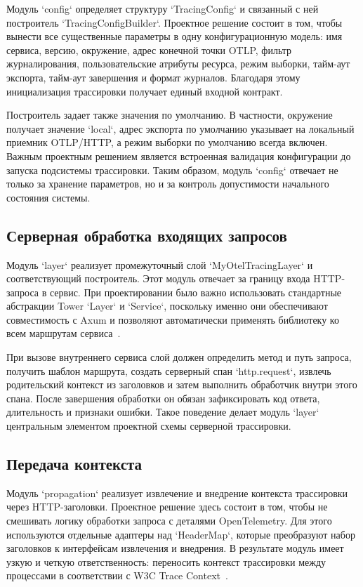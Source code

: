 Модуль `config` определяет структуру `TracingConfig` и связанный с ней построитель
`TracingConfigBuilder`. Проектное решение состоит в том, чтобы вынести все
существенные параметры в одну конфигурационную модель: имя сервиса, версию,
окружение, адрес конечной точки OTLP, фильтр журналирования, пользовательские
атрибуты ресурса, режим выборки, тайм-аут экспорта, тайм-аут завершения и формат
журналов. Благодаря этому инициализация трассировки получает единый входной
контракт.

Построитель задает также значения по умолчанию. В частности, окружение получает
значение `local`, адрес экспорта по умолчанию указывает на локальный приемник
OTLP/HTTP, а режим выборки по умолчанию всегда включен. Важным проектным решением
является встроенная валидация конфигурации до запуска подсистемы трассировки.
Таким образом, модуль `config` отвечает не только за хранение параметров, но и за
контроль допустимости начального состояния системы.

\subsection{Серверная обработка входящих запросов}

Модуль `layer` реализует промежуточный слой `MyOtelTracingLayer` и соответствующий
построитель. Этот модуль отвечает за границу входа HTTP-запроса в сервис. При
проектировании было важно использовать стандартные абстракции Tower `Layer` и
`Service`, поскольку именно они обеспечивают совместимость с Axum и позволяют
автоматически применять библиотеку ко всем маршрутам сервиса~\cite{towerDocs,axumDocs}.

При вызове внутреннего сервиса слой должен определить метод и путь запроса,
получить шаблон маршрута, создать серверный спан `http.request`, извлечь
родительский контекст из заголовков и затем выполнить обработчик внутри этого
спана. После завершения обработки он обязан зафиксировать код ответа,
длительность и признаки ошибки. Такое поведение делает модуль `layer` центральным
элементом проектной схемы серверной трассировки.

\subsection{Передача контекста}

Модуль `propagation` реализует извлечение и внедрение контекста трассировки через
HTTP-заголовки. Проектное решение здесь состоит в том, чтобы не смешивать логику
обработки запроса с деталями OpenTelemetry. Для этого используются отдельные
адаптеры над `HeaderMap`, которые преобразуют набор заголовков к интерфейсам
извлечения и внедрения. В результате модуль имеет узкую и четкую ответственность:
переносить контекст трассировки между процессами в соответствии с W3C Trace
Context~\cite{w3cTraceContext,opentelemetryPropagationDocs}.

